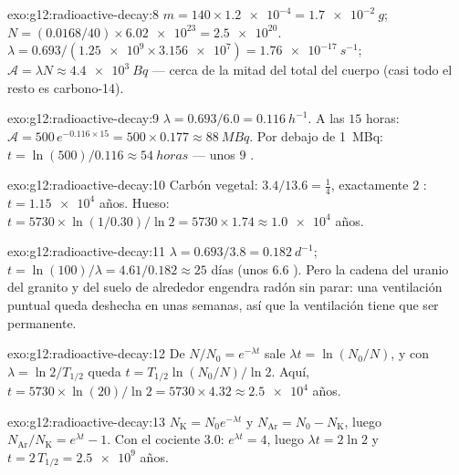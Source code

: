 \begin{solution}{exo:g12:radioactive-decay:8}
$m = 140 \times \num{1.2e-4} = \qty{1.7e-2}{g}$;
$N = (0.0168/40) \times \num{6.02e23} = \num{2.5e20}$.
$\lambda = 0.693/(\num{1.25e9} \times \num{3.156e7}) =
\qty{1.76e-17}{s^{-1}}$;
$\mathcal A = \lambda N \approx \qty{4.4e3}{Bq}$ --- cerca de la mitad
del total del cuerpo (casi todo el resto es carbono-14).
\end{solution}

\begin{solution}{exo:g12:radioactive-decay:9}
$\lambda = 0.693/6.0 = \qty{0.116}{h^{-1}}$. A las $15$ horas:
$\mathcal A = 500\,e^{-0.116 \times 15} = 500 \times 0.177 \approx
\qty{88}{MBq}$. Por debajo de \qty{1}{MBq}:
$t = \ln(500)/0.116 \approx \qty{54}{horas}$ --- unos $9$ .
\end{solution}

\begin{solution}{exo:g12:radioactive-decay:10}
Carbón vegetal: $3.4/13.6 = \tfrac14$, exactamente $2$ :
$t = \num{1.15e4}$ años. Hueso:
$t = \num{5730} \times \ln(1/0.30)/\ln 2 = \num{5730} \times 1.74
\approx \num{1.0e4}$ años.
\end{solution}

\begin{solution}{exo:g12:radioactive-decay:11}
$\lambda = 0.693/3.8 = \qty{0.182}{d^{-1}}$;
$t = \ln(100)/\lambda = 4.61/0.182 \approx 25$ días (unos $6.6$
). Pero la cadena del uranio del granito y del suelo de
alrededor engendra radón sin parar: una ventilación puntual queda
deshecha en unas semanas, así que la ventilación tiene que ser
permanente.
\end{solution}

\begin{solution}{exo:g12:radioactive-decay:12}
De $N/N_0 = e^{-\lambda t}$ sale $\lambda t = \ln(N_0/N)$, y con
$\lambda = \ln 2/T_{1/2}$ queda $t = T_{1/2}\ln(N_0/N)/\ln 2$. Aquí,
$t = \num{5730} \times \ln(20)/\ln 2 = \num{5730} \times 4.32 \approx
\num{2.5e4}$ años.
\end{solution}

\begin{solution}{exo:g12:radioactive-decay:13}
$N_{\mathrm K} = N_0 e^{-\lambda t}$ y
$N_{\mathrm{Ar}} = N_0 - N_{\mathrm K}$, luego
$N_{\mathrm{Ar}}/N_{\mathrm K} = e^{\lambda t} - 1$. Con el cociente
$3.0$: $e^{\lambda t} = 4$, luego $\lambda t = 2\ln 2$ y
$t = 2\,T_{1/2} = \num{2.5e9}$ años.
\end{solution}

